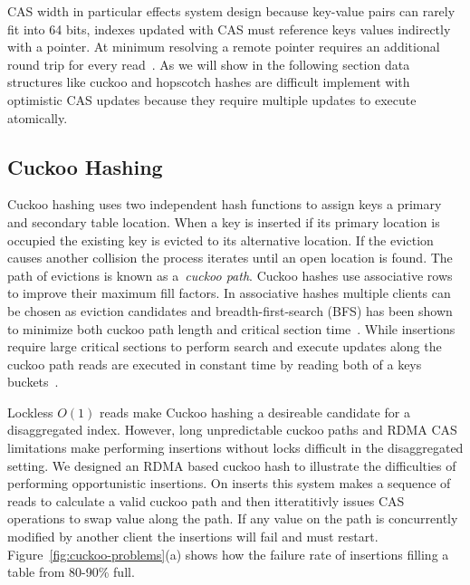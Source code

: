 CAS width in particular effects system design because
key-value pairs can rarely fit into 64 bits, indexes updated
with CAS must reference keys values indirectly with a
pointer. At minimum resolving a remote pointer requires an
additional round trip for every read~\cite{race,clover}.
As we will show in the following section data structures
like cuckoo and hopscotch hashes are difficult implement with
optimistic CAS updates because they require multiple updates
to execute atomically.


\subsection{Cuckoo Hashing} 
\label{sec:cuckoo-back}
Cuckoo hashing uses two independent hash functions to assign
keys a primary and secondary table location. When a key is
inserted if its primary location is occupied the existing
key is evicted to its alternative location. If the eviction
causes another collision the process iterates until an open
location is found. The path of evictions is known as
a~\textit{cuckoo path}. Cuckoo hashes use associative rows
to improve their maximum fill factors. In associative hashes
multiple clients can be chosen as eviction candidates and
breadth-first-search (BFS) has been shown to minimize both
cuckoo path length and critical section time~\cite{memc3,
cuckoo-improvements}.  While insertions require large
critical sections to perform search and execute updates
along the cuckoo path reads are executed in constant time by
reading both of a keys buckets~\cite{pilaf}.


Lockless $O(1)$ reads make Cuckoo hashing a desireable
candidate for a disaggregated index. However, long
unpredictable cuckoo paths and RDMA CAS limitations make
performing insertions without locks difficult in the
disaggregated setting. We designed an RDMA based cuckoo hash
to illustrate the difficulties of performing opportunistic
insertions. On inserts this system makes a sequence of reads
to calculate a valid cuckoo path and then itteratitivly
issues CAS operations to swap value along the path. If any
value on the path is concurrently modified by another client
the insertions will fail and must restart.
Figure~\ref{fig:cuckoo-problems}(a) shows how the failure
rate of insertions filling a table from 80-90\% full.

